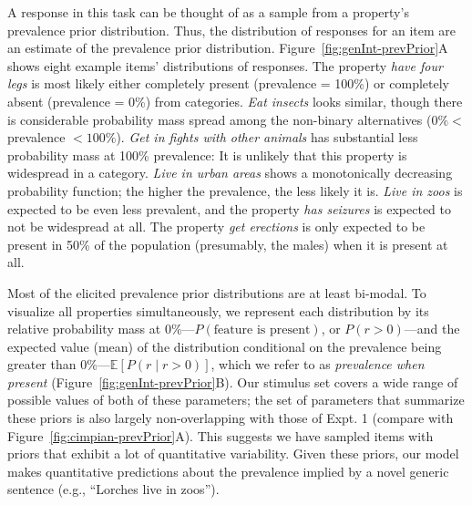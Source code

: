 \documentclass[floatsintext,doc]{apa6}
\theoremstyle{definition}
\theoremstyle{definition}
\theoremstyle{definition}
\theoremstyle{remark}
\begin{document}
A response in this task can be thought of as a sample from a property's
prevalence prior distribution. Thus, the distribution of responses for
an item are an estimate of the prevalence prior distribution.
Figure~\ref{fig:genInt-prevPrior}A shows eight example items'
distributions of responses. The property \emph{have four legs} is most
likely either completely present (prevalence = 100\%) or completely
absent (prevalence = 0\%) from categories. \emph{Eat insects} looks
similar, though there is considerable probability mass spread among the
non-binary alternatives (\(0\% <\) prevalence \(< 100\%\)). \emph{Get in
fights with other animals} has substantial less probability mass at
100\% prevalence: It is unlikely that this property is widespread in a
category. \emph{Live in urban areas} shows a monotonically decreasing
probability function; the higher the prevalence, the less likely it is.
\emph{Live in zoos} is expected to be even less prevalent, and the
property \emph{has seizures} is expected to not be widespread at all.
The property \emph{get erections} is only expected to be present in 50\%
of the population (presumably, the males) when it is present at all.

Most of the elicited prevalence prior distributions are at least
bi-modal. To visualize all properties simultaneously, we represent each
distribution by its relative probability mass at
0\%---\(P(\text{feature is present})\), or \(P(r > 0)\)---and the
expected value (mean) of the distribution conditional on the prevalence
being greater than 0\%---\(\mathbb{E}[P(r \mid r>0)]\), which we refer
to as \emph{prevalence when present}
(Figure~\ref{fig:genInt-prevPrior}B). Our stimulus set covers a wide
range of possible values of both of these parameters; the set of
parameters that summarize these priors is also largely non-overlapping
with those of Expt. 1 (compare with
Figure~\ref{fig:cimpian-prevPrior}A). This suggests we have sampled
items with priors that exhibit a lot of quantitative variability. Given
these priors, our model makes quantitative predictions about the
prevalence implied by a novel generic sentence (e.g., \enquote{Lorches
live in zoos}).
\end{document}
